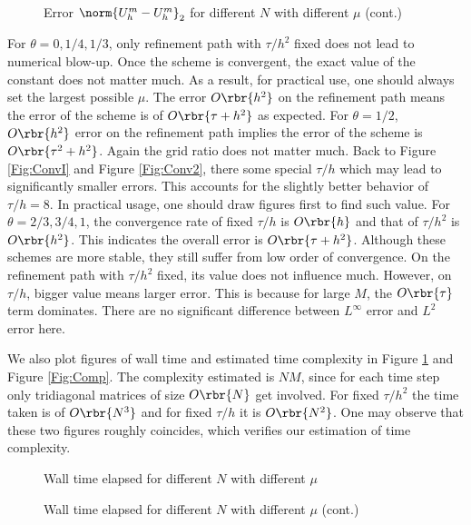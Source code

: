 \documentclass[english, nochinese]{pnote}
\begin{document}
\begin{figure}[htbp]
\ContinuedFloat
\centering
\scalebox{0.75}{}
\caption{Error $ \norm{ U_h^m - U_h^m }_2 $ for different $N$ with different $\mu$ (cont.)}
\end{figure}

For $ \theta = 0, 1 / 4, 1 / 3 $, only refinement path with $ \tau / h^2 $ fixed does not lead to numerical blow-up. Once the scheme is convergent, the exact value of the constant does not matter much. As a result, for practical use, one should always set the largest possible $\mu$. The error $ O \rbr{h^2} $ on the refinement path means the error of the scheme is of $ O \rbr{ \tau + h^2 } $ as expected. For $ \theta = 1 / 2 $, $ O \rbr{h^2} $ error on the refinement path implies the error of the scheme is $ O \rbr{ \tau^2 + h^2 } $. Again the grid ratio does not matter much. Back to Figure \ref{Fig:ConvI} and Figure \ref{Fig:Conv2}, there some special $ \tau / h $ which may lead to significantly smaller errors. This accounts for the slightly better behavior of $ \tau / h = 8 $. In practical usage, one should draw figures first to find such value. For $ \theta = 2 / 3, 3 / 4, 1 $, the convergence rate of fixed $ \tau / h $ is $ O \rbr{h} $ and that of $ \tau / h^2 $ is $ O \rbr{h^2} $. This indicates the overall error is $ O \rbr{ \tau + h^2 } $. Although these schemes are more stable, they still suffer from low order of convergence. On the refinement path with $ \tau / h^2 $ fixed, its value does not influence much. However, on $ \tau / h $, bigger value means larger error. This is because for large $M$, the $ O \rbr{\tau} $ term dominates. There are no significant difference between $L^{\infty}$ error and $L^2$ error here.

We also plot figures of wall time and estimated time complexity in Figure \ref{Fig:Wall} and Figure \ref{Fig:Comp}. The complexity estimated is $ N M $, since for each time step only tridiagonal matrices of size $ O \rbr{N} $ get involved. For fixed $ \tau / h^2 $ the time taken is of $ O \rbr{N^3} $ and for fixed $ \tau / h $ it is $ O \rbr{N^2} $. One may observe that these two figures roughly coincides, which verifies our estimation of time complexity.

\begin{figure}[htbp]
\centering
\scalebox{0.75}{}
\caption{Wall time elapsed for different $N$ with different $\mu$}
\label{Fig:Wall}
\end{figure}

\begin{figure}[htbp]
\ContinuedFloat
\centering
\scalebox{0.75}{}
\caption{Wall time elapsed for different $N$ with different $\mu$ (cont.)}
\end{figure}
\end{document}
